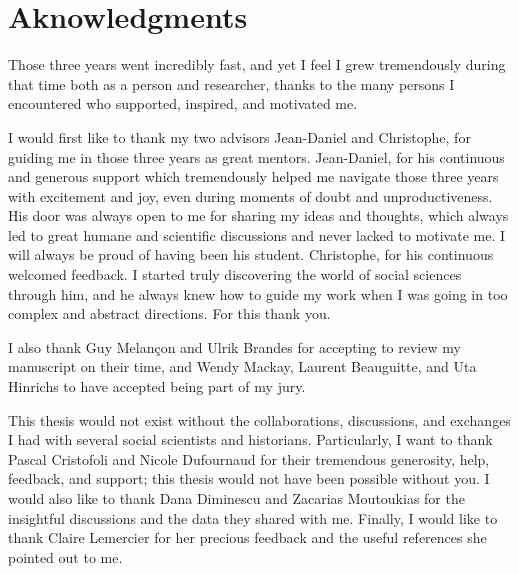 \chapter*{Aknowledgments}

Those three years went incredibly fast, and yet I feel I grew tremendously during that time both as a person and researcher, thanks to the many persons I encountered who supported, inspired, and motivated me.

I would first like to thank my two advisors Jean-Daniel and Christophe, for guiding me in those three years as great mentors.
Jean-Daniel, for his continuous and generous support which tremendously helped me navigate those three years with excitement and joy, even during moments of doubt and unproductiveness.
His door was always open to me for sharing my ideas and thoughts, which always led to great humane and scientific discussions and never lacked to motivate me.
I will always be proud of having been his student.
Christophe, for his continuous welcomed feedback.
I started truly discovering the world of social sciences through him, and he always knew how to guide my work when I was going in too complex and abstract directions. For this thank you.

I also thank Guy Melançon and Ulrik Brandes for accepting to review my manuscript on their time, and Wendy Mackay, Laurent Beauguitte, and Uta Hinrichs to have accepted being part of my jury.

This thesis would not exist without the collaborations, discussions, and exchanges I had with several social scientists and historians.
Particularly, I want to thank Pascal Cristofoli and Nicole Dufournaud for their tremendous generosity, help, feedback, and support; this thesis would not have been possible without you.
I would also like to thank Dana Diminescu and Zacarias Moutoukias for the insightful discussions and the data they shared with me.
Finally, I would like to thank Claire Lemercier for her precious feedback and the useful references she pointed out to me.


